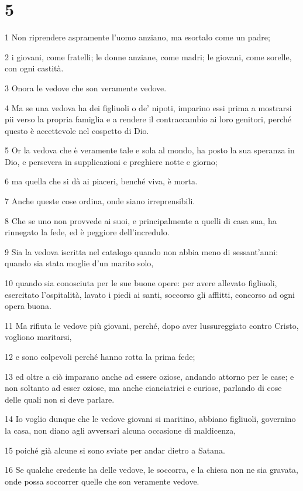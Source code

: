\chapter{5}

\par 1 Non riprendere aspramente l'uomo anziano, ma esortalo come un padre;
\par 2 i giovani, come fratelli; le donne anziane, come madri; le giovani, come sorelle, con ogni castità.
\par 3 Onora le vedove che son veramente vedove.
\par 4 Ma se una vedova ha dei figliuoli o de' nipoti, imparino essi prima a mostrarsi pii verso la propria famiglia e a rendere il contraccambio ai loro genitori, perché questo è accettevole nel cospetto di Dio.
\par 5 Or la vedova che è veramente tale e sola al mondo, ha posto la sua speranza in Dio, e persevera in supplicazioni e preghiere notte e giorno;
\par 6 ma quella che si dà ai piaceri, benché viva, è morta.
\par 7 Anche queste cose ordina, onde siano irreprensibili.
\par 8 Che se uno non provvede ai suoi, e principalmente a quelli di casa sua, ha rinnegato la fede, ed è peggiore dell'incredulo.
\par 9 Sia la vedova iscritta nel catalogo quando non abbia meno di sessant'anni: quando sia stata moglie d'un marito solo,
\par 10 quando sia conosciuta per le sue buone opere: per avere allevato figliuoli, esercitato l'ospitalità, lavato i piedi ai santi, soccorso gli afflitti, concorso ad ogni opera buona.
\par 11 Ma rifiuta le vedove più giovani, perché, dopo aver lussureggiato contro Cristo, vogliono maritarsi,
\par 12 e sono colpevoli perché hanno rotta la prima fede;
\par 13 ed oltre a ciò imparano anche ad essere oziose, andando attorno per le case; e non soltanto ad esser oziose, ma anche cianciatrici e curiose, parlando di cose delle quali non si deve parlare.
\par 14 Io voglio dunque che le vedove giovani si maritino, abbiano figliuoli, governino la casa, non diano agli avversari alcuna occasione di maldicenza,
\par 15 poiché già alcune si sono sviate per andar dietro a Satana.
\par 16 Se qualche credente ha delle vedove, le soccorra, e la chiesa non ne sia gravata, onde possa soccorrer quelle che son veramente vedove.
